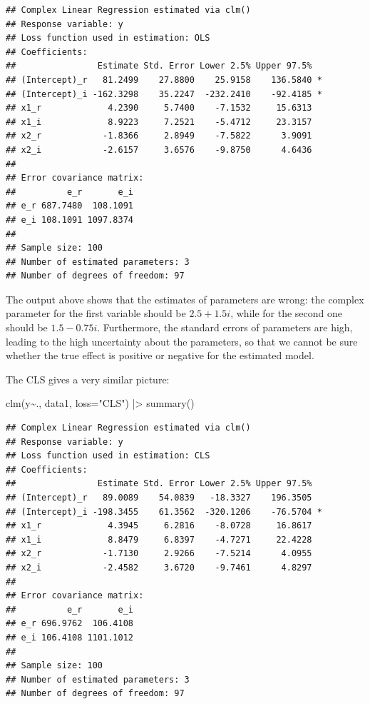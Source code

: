 \documentclass[
]{book}
\newenvironment{Shaded}{\begin{snugshade}}{\end{snugshade}}
\newcommand{\AttributeTok}[1]{\textcolor[rgb]{0.77,0.63,0.00}{#1}}
\newcommand{\FunctionTok}[1]{\textcolor[rgb]{0.00,0.00,0.00}{#1}}
\newcommand{\NormalTok}[1]{#1}
\newcommand{\SpecialCharTok}[1]{\textcolor[rgb]{0.00,0.00,0.00}{#1}}
\newcommand{\StringTok}[1]{\textcolor[rgb]{0.31,0.60,0.02}{#1}}
\begin{document}
\begin{verbatim}
## Complex Linear Regression estimated via clm()
## Response variable: y
## Loss function used in estimation: OLS
## Coefficients:
##                Estimate Std. Error Lower 2.5% Upper 97.5%  
## (Intercept)_r   81.2499    27.8800    25.9158    136.5840 *
## (Intercept)_i -162.3298    35.2247  -232.2410    -92.4185 *
## x1_r             4.2390     5.7400    -7.1532     15.6313  
## x1_i             8.9223     7.2521    -5.4712     23.3157  
## x2_r            -1.8366     2.8949    -7.5822      3.9091  
## x2_i            -2.6157     3.6576    -9.8750      4.6436  
## 
## Error covariance matrix:
##          e_r       e_i
## e_r 687.7480  108.1091
## e_i 108.1091 1097.8374
## 
## Sample size: 100
## Number of estimated parameters: 3
## Number of degrees of freedom: 97
\end{verbatim}

The output above shows that the estimates of parameters are wrong: the complex parameter for the first variable should be \(2.5 + 1.5i\), while for the second one should be \(1.5 - 0.75i\). Furthermore, the standard errors of parameters are high, leading to the high uncertainty about the parameters, so that we cannot be sure whether the true effect is positive or negative for the estimated model.

The CLS gives a very similar picture:

\begin{Shaded}
\begin{Highlighting}[]
\FunctionTok{clm}\NormalTok{(y}\SpecialCharTok{\textasciitilde{}}\NormalTok{., data1, }\AttributeTok{loss=}\StringTok{"CLS"}\NormalTok{) }\SpecialCharTok{|\textgreater{}}
    \FunctionTok{summary}\NormalTok{()}
\end{Highlighting}
\end{Shaded}

\begin{verbatim}
## Complex Linear Regression estimated via clm()
## Response variable: y
## Loss function used in estimation: CLS
## Coefficients:
##                Estimate Std. Error Lower 2.5% Upper 97.5%  
## (Intercept)_r   89.0089    54.0839   -18.3327    196.3505  
## (Intercept)_i -198.3455    61.3562  -320.1206    -76.5704 *
## x1_r             4.3945     6.2816    -8.0728     16.8617  
## x1_i             8.8479     6.8397    -4.7271     22.4228  
## x2_r            -1.7130     2.9266    -7.5214      4.0955  
## x2_i            -2.4582     3.6720    -9.7461      4.8297  
## 
## Error covariance matrix:
##          e_r       e_i
## e_r 696.9762  106.4108
## e_i 106.4108 1101.1012
## 
## Sample size: 100
## Number of estimated parameters: 3
## Number of degrees of freedom: 97
\end{verbatim}
\end{document}
